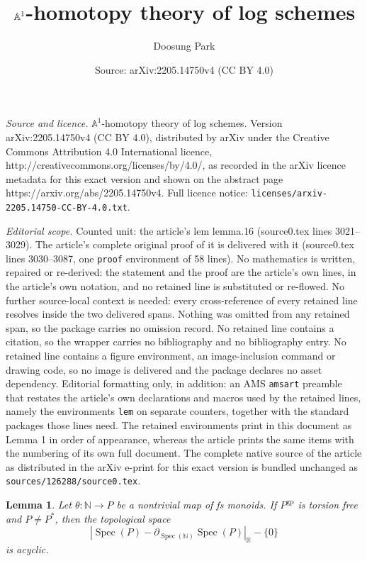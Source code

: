 \documentclass[10pt,a4paper]{amsart}
\title{$\A^1$-homotopy theory of log schemes}
\author{Doosung Park}
\date{Source: arXiv:2205.14750v4 (CC BY 4.0)}
\newcommand{\A}{\mathbb{A}}
\newtheorem{lem}{Lemma}
\newcommand{\N}{\mathbb{N}}
\newcommand{\R}{\mathbb{R}}
\DeclareMathOperator{\Spec}{Spec}
\newcommand{\gp}{\mathrm{gp}}
\begin{document}
\maketitle

\noindent\emph{Source and licence.} $\A^1$-homotopy theory of log schemes. Version arXiv:2205.14750v4 (CC BY 4.0), distributed by arXiv under the Creative Commons Attribution 4.0 International licence, http://creativecommons.org/licenses/by/4.0/, as recorded in the arXiv licence metadata for this exact version and shown on the abstract page https://arxiv.org/abs/2205.14750v4. Full licence notice: \texttt{licenses/arxiv-2205.14750-CC-BY-4.0.txt}.\par\smallskip

\noindent\textit{Editorial scope.} Counted unit: the article's lem lemma.16 (source0.tex lines 3021--3029). The article's complete original proof of it is delivered with it (source0.tex lines 3030--3087, one \texttt{proof} environment of 58 lines). No mathematics is written, repaired or re-derived: the statement and the proof are the article's own lines, in the article's own notation, and no retained line is substituted or re-flowed.  No further source-local context is needed: every cross-reference of every retained line resolves inside the two delivered spans.  Nothing was omitted from any retained span, so the package carries no omission record.  No retained line contains a citation, so the wrapper carries no bibliography and no bibliography entry.  No retained line contains a figure environment, an image-inclusion command or drawing code, so no image is delivered and the package declares no asset dependency.  Editorial formatting only, in addition: an AMS \texttt{amsart} preamble that restates the article's own declarations and macros used by the retained lines, namely the environments \texttt{lem} on separate counters, together with the standard packages those lines need.  The retained environments print in this document as Lemma 1 in order of appearance, whereas the article prints the same items with the numbering of its own full document.  The complete native source of the article as distributed in the arXiv e-print for this exact version is bundled unchanged as \texttt{sources/126288/source0.tex}.
\begin{lem}
\label{lemma.16}
Let $\theta\colon \N\to P$ be a nontrivial map of fs monoids.
If $P^\gp$ is torsion free and $P\neq P^*$, then the topological space
\[
|\Spec(P)-\partial_{\Spec(\N)}\Spec(P)|_{\R}-\{0\}
\]
is acyclic.
\end{lem}
\end{document}
